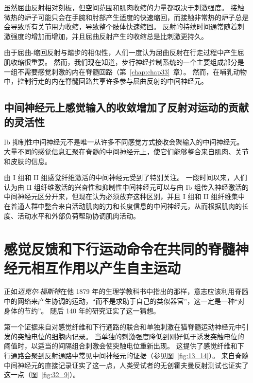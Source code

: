 虽然屈曲反射相对刻板，但空间范围和肌肉收缩的力量都取决于刺激强度。
接触微热的炉子可能只会在手腕和肘部产生适度的快速缩回，而接触非常热的炉子总是会导致所有关节用力收缩，导致整个肢体快速缩回。
反射的持续时间通常随着刺激强度的增加而增加，并且屈曲反射产生的收缩总是比刺激更持久。


由于屈曲-缩回反射与踏步的相似性，人们一度认为屈曲反射在行走过程中产生屈肌收缩很重要。
然而，我们现在知道，步行神经控制系统的一个主要组成部分是一组不需要感觉刺激的内在脊髓回路（第~\ref{chap:chap33}~章）。
然而，在哺乳动物中，控制行走的内在脊髓回路共享许多参与屈曲反射的中间神经元。



\subsection{中间神经元上感觉输入的收敛增加了反射对运动的贡献的灵活性}

Ib 抑制性中间神经元不是唯一从许多不同感觉方式接收会聚输入的中间神经元。
大量不同的感觉信息汇聚在脊髓的中间神经元上，使它们能够整合来自肌肉、关节和皮肤的信息。


由 I 组和 II 组感觉纤维激活的中间神经元受到了特别关注。
一段时间以来，人们认为由 II 组纤维激活的兴奋性和抑制性中间神经元可以与由 Ib 组传入神经激活的中间神经元区分开来，但现在认为必须放弃这种区别，并且 I 组和 II 组纤维集中在普通人群中整合来自活动肌肉的力和长度信息的中间神经元，从而根据肌肉的长度、活动水平和外部负荷帮助协调肌肉活动。



\section{感觉反馈和下行运动命令在共同的脊髓神经元相互作用以产生自主运动}

正如\textit{迈克尔$\cdot$福斯特}在他 1879 年的生理学教科书中指出的那样，意志应该利用脊髓中的网络来产生协调的运动，“而不是求助于自己的类似器官”，这一定是一种“对身体的节约”。
随后 140 年的研究证实了这一猜想。


第一个证据来自对感觉纤维和下行通路的联合和单独刺激在猫脊髓运动神经元中引发的突触电位的细胞内记录。
当单独的刺激强度降低到刚好低于诱发突触电位的阈值时，以适当的间隔组合刺激会使突触电位重新出现。
这提供了感觉纤维和下行通路会聚到反射通路中常见中间神经元的证据（参见图~\ref{fig:13_14}）。
来自脊髓中间神经元的直接记录证实了这一点，人类受试者的无创霍夫曼反射测试也证实了这一点（图~\ref{fig:32_9}）。


